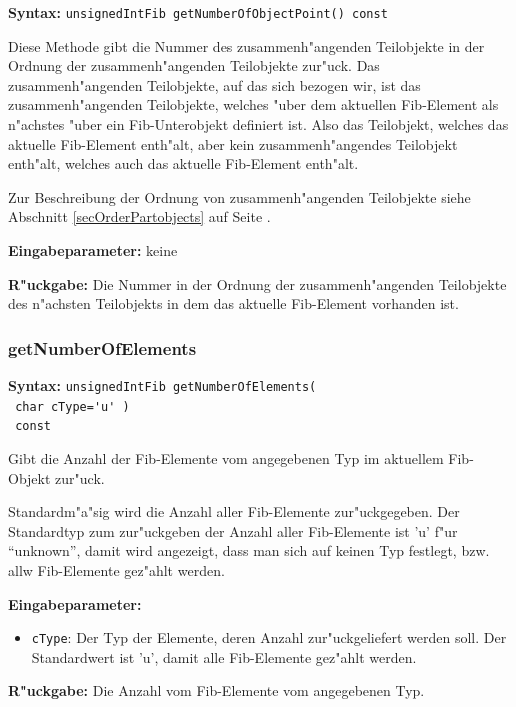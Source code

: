 \textbf{Syntax:} \verb|unsignedIntFib getNumberOfObjectPoint() const|

\bigskip\noindent
Diese Methode gibt die Nummer des zusammenh"angenden Teilobjekte in der Ordnung der zusammenh"angenden Teilobjekte zur"uck. Das zusammenh"angenden Teilobjekte, auf das sich bezogen wir, ist das zusammenh"angenden Teilobjekte, welches "uber dem aktuellen Fib-Element als n"achstes "uber ein Fib-Unterobjekt definiert ist. Also das Teilobjekt, welches das aktuelle Fib-Element enth"alt, aber kein zusammenh"angendes Teilobjekt enth"alt, welches auch das aktuelle Fib-Element enth"alt.

Zur Beschreibung der Ordnung von zusammenh"angenden Teilobjekte siehe Abschnitt \ref{secOrderPartobjects} auf Seite \pageref{secOrderPartobjects} .

\bigskip\noindent
\textbf{Eingabeparameter:} keine

\bigskip\noindent
\textbf{R"uckgabe:} Die Nummer in der Ordnung der zusammenh"angenden Teilobjekte des n"achsten Teilobjekts in dem das aktuelle Fib-Element vorhanden ist.


\subsubsection{getNumberOfElements}

\textbf{Syntax:} \verb|unsignedIntFib getNumberOfElements(| \\\verb| char cType='u' )| \\\verb| const|

\bigskip\noindent
Gibt die Anzahl der Fib-Elemente vom angegebenen Typ im aktuellem Fib-Objekt zur"uck.

Standardm"a"sig wird die Anzahl aller Fib-Elemente zur"uckgegeben. Der Standardtyp zum zur"uckgeben der Anzahl aller Fib-Elemente ist 'u' f"ur ``unknown'', damit wird angezeigt, dass man sich auf keinen Typ festlegt, bzw. allw Fib-Elemente gez"ahlt werden.

\bigskip\noindent
\textbf{Eingabeparameter:}
\begin{itemize}
 \item \verb|cType|: Der Typ der Elemente, deren Anzahl zur"uckgeliefert werden soll. Der Standardwert ist 'u', damit alle Fib-Elemente gez"ahlt werden.
\end{itemize}

\bigskip\noindent
\textbf{R"uckgabe:} Die Anzahl vom Fib-Elemente vom angegebenen Typ.


